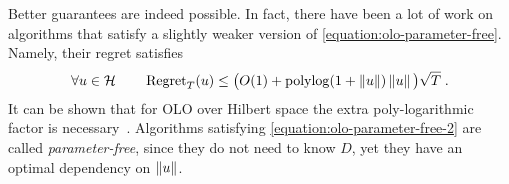 Better guarantees are indeed possible. In fact, there have been a lot of work on algorithms \citep{Streeter-McMahan-2012,
Orabona-2013, McMahan-Abernethy-2013,
McMahan-Orabona-2014,Orabona-2014} that satisfy a slightly
weaker version of \eqref{equation:olo-parameter-free}. Namely, their regret satisfies
\begin{equation}
\label{equation:olo-parameter-free-2}
\forall u \in \mathcal{H} \qquad \operatorname{Regret}_T(u) \le \big(O(1)+\operatorname{polylog}(1 + \left\|{u}\right\|)\left\|{u}\right\| \big) \sqrt{T} \; .
\end{equation}
It can be shown that for \ac{OLO} over Hilbert space the extra poly-logarithmic
factor is necessary~\citep{McMahan-Abernethy-2013,Orabona-2013}. Algorithms
satisfying \eqref{equation:olo-parameter-free-2} are called
\emph{parameter-free}, since they do not need to know $D$, yet they have an
optimal dependency on $\left\|{u}\right\|$.
